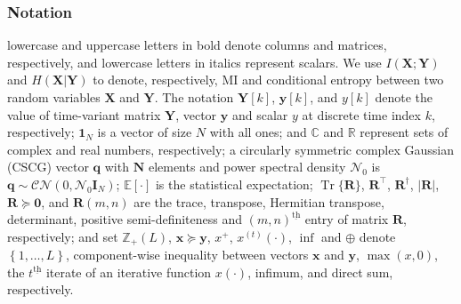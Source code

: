 \documentclass[9pt,journal]{IEEEtran}
\DeclareMathOperator{\trace}{Tr}
\newcommand{\paren}[1]{\left({#1}\right)}
\newcommand{\bracket}[1]{{\left [{#1}\right ]}}
\newcommand{\ith}[1]    {{#1}^{\underline{\text{th}}}}
\theoremstyle{definition}
\begin{document}
\subsubsection*{Notation} lowercase and uppercase letters in bold denote columns and matrices, respectively, and lowercase letters in italics represent scalars. We use $I(\mathbf{X};\mathbf{Y})$ and $H\paren{\mathbf{X}|\mathbf{Y}}$ to denote, respectively, MI and conditional entropy between two random variables $\mathbf{X}$ and $\mathbf{Y}$. The notation $\mathbf{Y}\bracket{k}$, $\mathbf{y}\bracket{k}$, and $y\bracket{k}$ denote the value of time-variant matrix $\mathbf{Y}$, vector $\mathbf{y}$ and scalar $y$ at discrete time index $k$, respectively; $\mathbf{1}_{\mathit{N}}$ is a vector of size $\mathit{N}$ with all ones; and $\mathbb{C}$ and $\mathbb{R}$ represent sets of complex and real numbers, respectively; a circularly symmetric complex Gaussian (CSCG) vector $\mathbf{q}$ with $\mathbf{N}$ elements and power spectral density $\mathcal{N}_0$ is $\mathbf{q}\sim\mathcal{CN}(0,\mathcal{N}_0\mathbf{I}_{\mathit{N}})$; $\mathbb{E}\bracket{\cdot}$ is the statistical expectation; $\trace\{\mathbf{R}\}$, $\mathbf{R}^\top$, $\mathbf{R}^\dagger$, $\left| \mathbf{R}\right|$, $\mathbf{R}\succeq\mathbf{0}$, and $\mathbf{R}\paren{m,n}$ are the trace, transpose, Hermitian transpose, determinant, positive semi-definiteness and $\ith{\paren{m,n}}$ entry of matrix $\mathbf{R}$, respectively; and set $\mathbb{Z}_{+}(L)$, $\mathbf{x}\succeq\mathbf{y}$, $x^+$, $x^{\paren{t}}\paren{\cdot}$, $\inf$ and $\oplus$ denote $\left\lbrace1,\dots,L\right\rbrace$,  component-wise inequality between vectors $\mathbf{x}$ and $\mathbf{y}$, $\max(x,0)$, the $\ith{t}$ iterate of an iterative function $x\paren{\cdot}$, infimum, and direct sum, respectively.
\end{document}
